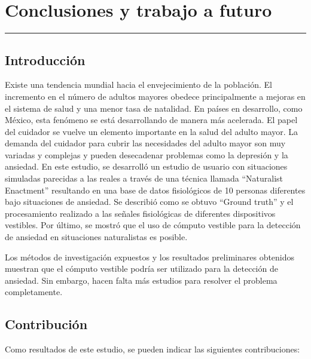 
\chapter{Conclusiones y trabajo a futuro}\label{capit:cap5}
\vspace{-2.0325ex}%
\noindent
\rule{\textwidth}{0.5pt}
\vspace{-5.5ex}%
\newcommand{\pushline}{\Indp}%

\section{Introducci\'on}
	Existe una tendencia mundial hacia el envejecimiento de la población. El incremento en el n\'umero de adultos mayores obedece principalmente a mejoras en el sistema de salud y una menor tasa de natalidad. En países en desarrollo, como M\'exico, esta fenómeno se está desarrollando de manera más acelerada. El papel del cuidador se vuelve un elemento importante en la salud del adulto mayor. La demanda del cuidador para cubrir las necesidades del adulto mayor son muy variadas y complejas y pueden desecadenar problemas como la depresi\'on y la ansiedad.
En este estudio, se desarroll\'o un estudio de usuario con situaciones simuladas parecidas a las reales a trav\'es de una t\'ecnica llamada ``Naturalist Enactment'' resultando en una base de datos fisiol\'ogicos de 10 personas diferentes bajo situaciones de ansiedad. Se describi\'o como se obtuvo ``Ground truth'' y el procesamiento realizado a las se\~nales fisiol\'ogicas de diferentes dispositivos vestibles. Por \'ultimo, se mostr\'o que el uso de c\'omputo vestible para la detecci\'on de ansiedad en situaciones naturalistas es posible.

Los m\'etodos de investigaci\'on expuestos y los resultados preliminares obtenidos muestran que el c\'omputo vestible podr\'ia ser utilizado para la detecci\'on de ansiedad. Sin embargo, hacen falta m\'as estudios para resolver el problema completamente.


\section{Contribuci\'on}
	Como resultados de este estudio, se pueden indicar las siguientes contribuciones:

